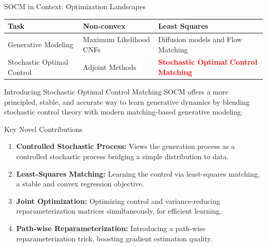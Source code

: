\documentclass[aspectratio=169,xcolor=dvipsnames]{beamer}
\begin{document}
\begin{frame}{SOCM in Context: Optimization Landscapes}
    \vspace{0.5cm}
    \begin{table}
        \centering
        \begin{tabular}{>{\centering\arraybackslash}p{}>{\centering\arraybackslash}p{}>{\centering\arraybackslash}p{}}
            \toprule
            \textbf{Task} & \textbf{Non-convex} & \textbf{Least Squares} \\
            \midrule
            Generative Modeling & Maximum Likelihood CNFs & Diffusion models and Flow Matching \\
            Stochastic Optimal Control & Adjoint Methods & \textcolor{red}{\textbf{Stochastic Optimal Control Matching}} \\
            \bottomrule
        \end{tabular}
    \end{table}
\end{frame}

\begin{frame}{Introducing Stochastic Optimal Control Matching}
    SOCM offers a more principled, stable, and accurate way to learn generative dynamics by blending stochastic control theory with modern matching-based generative modeling.
    
    \vspace{0.4cm}
    
    \begin{block}{Key Novel Contributions}
        \begin{enumerate}
            \item \textbf{Controlled Stochastic Process:} Views the generation process as a controlled stochastic process bridging a simple distribution to data.
            
            \vspace{0.2cm}
            
            \item \textbf{Least-Squares Matching:} Learning the control via least-squares matching, a stable and convex regression objective.
            
            \vspace{0.2cm}
            
            \item \textbf{Joint Optimization:} Optimizing control and variance-reducing reparameterization matrices simultaneously, for efficient learning.
            
            \vspace{0.2cm}
            
            \item \textbf{Path-wise Reparameterization:} Introducing a path-wise reparameterization trick, boosting gradient estimation quality.
        \end{enumerate}
    \end{block}
\end{frame}
\end{document}
